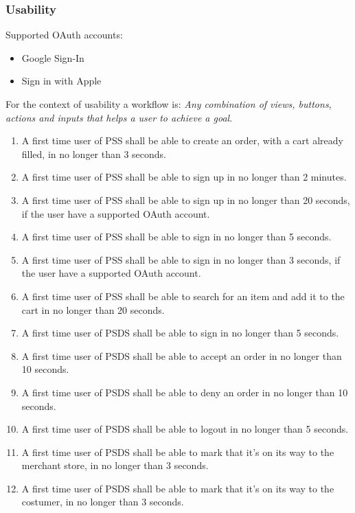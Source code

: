 \subsubsection{Usability}
Supported OAuth accounts: 
\begin{itemize}
    \item Google Sign-In
    \item Sign in with Apple
\end{itemize}
 
\noindent For the context of usability a workflow is: \textit{ Any combination 
of views, buttons, actions and inputs that helps a user to achieve a goal}.

\begin{enumerate}[label=USE-\arabic*]
    \item A first time user of PSS shall be able to create an order, with a 
    cart already filled, in no longer than 3 seconds.
    \item A first time user of PSS shall be able to sign up in no longer 
    than 2 minutes.
    \item A first time user of PSS shall be able to sign up in no longer 
    than 20 seconds, if the user have a supported OAuth account.
    \item A first time user of PSS shall be able to sign in no longer 
    than 5 seconds.
    \item A first time user of PSS shall be able to sign in no longer 
    than 3 seconds, if the user have a supported OAuth account.
    \item A first time user of PSS shall be able to search for an item and 
    add it to the cart in no longer than 20 seconds.
    \item A first time user of PSDS shall be able to sign in no longer 
    than 5 seconds.
    \item A first time user of PSDS shall be able to accept an order in no 
    longer than 10 seconds.
    \item A first time user of PSDS shall be able to deny an order in no 
    longer than 10 seconds.
    \item A first time user of PSDS shall be able to logout in no longer 
    than 5 seconds.
    \item A first time user of PSDS shall be able to mark that it’s on its 
    way to the merchant store, in no longer than 3 seconds.
    \item A first time user of PSDS shall be able to mark that it’s on its 
    way to the costumer, in no longer than 3 seconds.

\end{enumerate}
